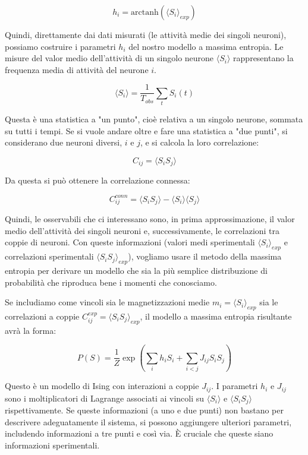 \begin{equation} \label{eq:ch22_30}
h_i = \text{arctanh}(\langle S_i \rangle_{exp})
\end{equation}

Quindi, direttamente dai dati misurati (le attività medie dei singoli neuroni), possiamo costruire i parametri $h_i$ del nostro modello a massima entropia.
Le misure del valor medio dell'attività di un singolo neurone $\langle S_i \rangle$ rappresentano la frequenza media di attività del neurone $i$.

\begin{equation} \label{eq:ch22_31}
\langle S_i \rangle = \frac{1}{T_{obs}} \sum_t S_i(t)
\end{equation}

Questa è una statistica a "un punto", cioè relativa a un singolo neurone, sommata su tutti i tempi.
Se si vuole andare oltre e fare una statistica a "due punti", si considerano due neuroni diversi, $i$ e $j$, e si calcola la loro correlazione:

\begin{equation} \label{eq:ch22_32}
C_{ij} = \langle S_i S_j \rangle
\end{equation}

Da questa si può ottenere la correlazione connessa:

\begin{equation} \label{eq:ch22_33}
C_{ij}^{conn} = \langle S_i S_j \rangle - \langle S_i \rangle \langle S_j \rangle
\end{equation}

Quindi, le osservabili che ci interessano sono, in prima approssimazione, il valor medio dell'attività dei singoli neuroni e, successivamente, le correlazioni tra coppie di neuroni.
Con queste informazioni (valori medi sperimentali $\langle S_i \rangle_{exp}$ e correlazioni sperimentali $\langle S_i S_j \rangle_{exp}$), vogliamo usare il metodo della massima entropia per derivare un modello che sia la più semplice distribuzione di probabilità che riproduca bene i momenti che conosciamo.

Se includiamo come vincoli sia le magnetizzazioni medie $m_i = \langle S_i \rangle_{exp}$ sia le correlazioni a coppie $C_{ij}^{exp} = \langle S_i S_j \rangle_{exp}$, il modello a massima entropia risultante avrà la forma:

\begin{equation} \label{eq:ch22_34}
P(S) = \frac{1}{Z} \exp\left( \sum_i h_i S_i + \sum_{i<j} J_{ij} S_i S_j \right)
\end{equation}

Questo è un modello di Ising con interazioni a coppie $J_{ij}$. I parametri $h_i$ e $J_{ij}$ sono i moltiplicatori di Lagrange associati ai vincoli su $\langle S_i \rangle$ e $\langle S_i S_j \rangle$ rispettivamente.
Se queste informazioni (a uno e due punti) non bastano per descrivere adeguatamente il sistema, si possono aggiungere ulteriori parametri, includendo informazioni a tre punti e così via. È cruciale che queste siano informazioni sperimentali.
